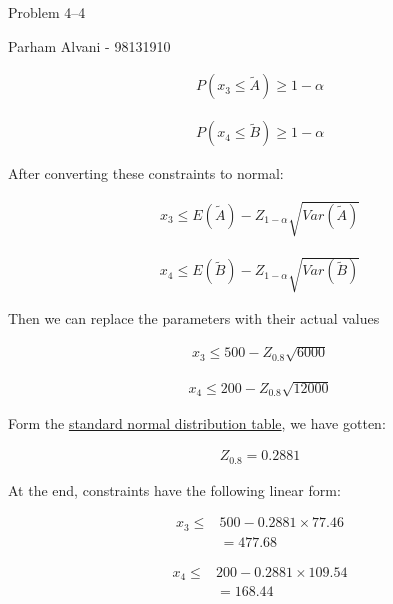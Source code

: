 \documentclass{article}
\begin{document}
\large %


{\Large Problem 4--4 %
\hfill  }

\begin{center}
{\Large Parham Alvani - 98131910} %
\end{center}
\vspace{0.05in}

\begin{align*}
        P(x_3 \le \tilde{A}) \ge 1 - \alpha
\end{align*}

\begin{align*}
        P(x_4 \le \tilde{B}) \ge 1 - \alpha
\end{align*}

\par
After converting these constraints to normal:

\begin{align*}
        x_3 \le E(\tilde{A}) - Z_{1-\alpha}\sqrt{Var(\tilde{A})}
\end{align*}

\begin{align*}
        x_4 \le E(\tilde{B}) - Z_{1-\alpha}\sqrt{Var(\tilde{B})}
\end{align*}

\par
Then we can replace the parameters with their actual values

\begin{align*}
        x_3 \le 500 - Z_{0.8}\sqrt{6000}
\end{align*}

\begin{align*}
        x_4 \le 200 - Z_{0.8}\sqrt{12000}
\end{align*}

Form the \href{https://www.growingknowing.com/GKStatsBookNormalTable1.html}{standard normal distribution table}, we have gotten:


\begin{align*}
        Z_{0.8} = 0.2881
\end{align*}

At the end, constraints have the following linear form:

\begin{align*}
        x_3 \le &500 - 0.2881 \times 77.46 \\
        & = 477.68
\end{align*}

\begin{align*}
        x_4 \le &200 - 0.2881 \times 109.54 \\
        & = 168.44
\end{align*}
\end{document}

